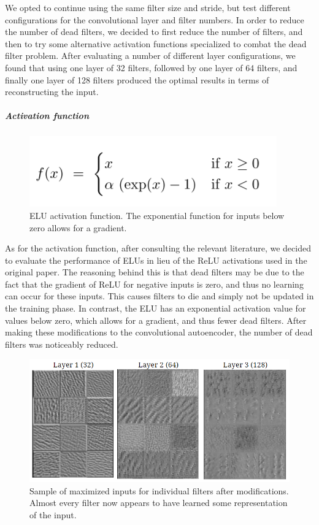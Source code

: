 \documentclass{article}
\begin{document}
We opted to continue using the same filter size and stride, but test different configurations for the convolutional layer and filter numbers. In order to reduce the number of dead filters, we decided to first reduce the number of filters, and then to try some alternative activation functions specialized to combat the dead filter problem. After evaluating a number of different layer configurations, we found that using one layer of 32 filters, followed by one layer of 64 filters, and finally one layer of 128 filters produced the optimal results in terms of reconstructing the input.
\subparagraph{Activation function}
\begin{figure}[!ht]
    \centering
    \includegraphics[scale=0.75]{elu}
    \caption{ELU activation function. The exponential function for inputs below zero allows for a gradient.}
\end{figure}
As for the activation function, after consulting the relevant literature, we decided to evaluate the performance of ELUs in lieu of the ReLU activations used in the original paper. The reasoning behind this is that dead filters may be due to the fact that the gradient of ReLU for negative inputs is zero, and thus no learning can occur for these inputs. This causes filters to die and simply not be updated in the training phase. In contrast, the ELU has an exponential activation value for values below zero, which allows for a gradient, and thus fewer dead filters. After making these modifications to the convolutional autoencoder, the number of dead filters was noticeably reduced.
\begin{figure}
    \centering
    \includegraphics{inputs_optimized}
    \caption{Sample of maximized inputs for individual filters after modifications. Almost every filter now appears to have learned some representation of the input.}\label{fig:inputs_optimized}
\end{figure}
\end{document}
